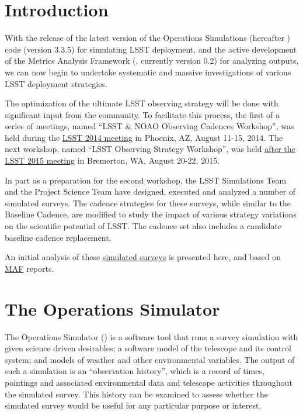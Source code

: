 
\section{Introduction}
\def\secname{cadexp:intro}\label{sec:\secname}

With the release of the latest version of the Operations Simulations
(hereafter \OpSim) code (version 3.3.5)  for simulating LSST
deployment, and the active development of the Metrics Analysis Framework
(\MAF,  currently version 0.2) for analyzing \OpSim outputs, we can
now begin to undertake systematic and  massive investigations of
various LSST deployment strategies.

The optimization of the ultimate LSST observing strategy will be done
with significant input from  the community. To facilitate this
process, the first of a series of meetings, named ``LSST \& NOAO
Observing Cadences Workshop'', was held during the
\href{https://project.lsst.org/meetings/ocw}{LSST 2014 meeting} in
Phoenix, AZ, August 11-15, 2014. The next workshop, named ``LSST
Observing Strategy Workshop'',  was held
\href{http://lsstsciencecollaborations.github.io/ObservingStrategy/}{after
the LSST 2015 meeting} in Bremerton, WA, August 20-22, 2015.

In part as a preparation for the second workshop, the LSST
Simulations Team and the Project Science Team have designed, executed
and analyzed a number of simulated surveys.  The cadence strategies
for these surveys, while similar to the Baseline Cadence, are modified to
study the impact of various strategy variations on the scientific
potential of LSST\@. The cadence set also includes a candidate baseline
cadence replacement.

An initial analysis of these
\href{http://opsim.lsst.org:8080}{simulated surveys} is presented here,
and based on \href{https://confluence.lsstcorp.org/display/SIM/MAF+documentation}{MAF}
reports.


\listofopsimdbs

\navigationbar


\section{The Operations Simulator}

The Operations Simulator (\OpSim) is a software tool that runs a survey simulation with given science driven desirables;
a software model of the telescope and its control system; and models of weather and other environmental variables. The
output of such a simulation is an “observation history”, which is a record of times, pointings and associated environmental  data  and  telescope  activities  throughout  the  simulated  survey.  This history can be examined to assess
whether the simulated survey would be useful for any particular purpose or interest.

